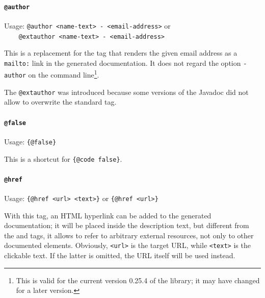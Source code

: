 
\paragraph{\lstinline|@author|}\label{sec:TagExtAuthor}  Usage: \lstinline|@author <name-text> - <email-address>| or \\
\lstinline|    @extauthor <name-text> - <email-address>|

This is a replacement for the  tag that renders the given email address as a \texttt{mailto:} link in the generated documentation. It does not regard the option \mbox{\texttt{-author}} on the command line\footnote{This is valid for the current version 0.25.4 of the library; it may have changed for a later version.}.

The \lstinline|@extauthor| was introduced because some versions of the Javadoc did not allow to overwrite the standard  tag.


\paragraph{\lstinline|@false|}\label{sec:TagFALSE}  Usage: \lstinline|{@false}|

This is a shortcut for \lstinline|{@code false}|.


\paragraph{\lstinline|@href|}\label{sec:TagHref}  Usage: \lstinline|{@href <url> <text>}| or \lstinline|{@href <url>}|

With this tag, an HTML hyperlink can be added to the generated documentation; it will be placed inside the description text, but different from the  and  tags, it allows to refer to arbitrary external resources, not only to other documented elements. Obviously, \texttt{<url>} is the target URL, while \texttt{<text>} is the clickable text. If the latter is omitted, the URL itself will be used instead.

